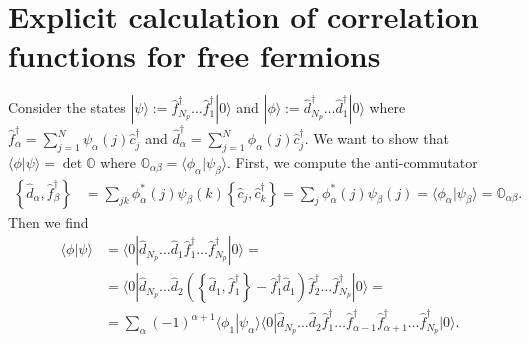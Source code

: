 \documentclass[english, parskip=full]{scrartcl}
\title{\titel}
\author{\autor}
\date{\today}
\newcommand{\brak}{}
\renewcommand{\braket}{}
\newcommand{\kla}{}
\newcommand{\klammer}{}
\newcommand{\Ket}{}
\begin{document}
\maketitle  %

\section{Explicit calculation of correlation functions for free fermions}
Consider the states $\Ket | \psi \rangle := \hat{f}_{N_p}^\dagger \dots \hat{f}_{1}^\dagger \Ket | 0 \rangle$ and $\Ket | \phi \rangle := \hat{d}_{N_p}^\dagger \dots \hat{d}_{1}^\dagger \Ket | 0 \rangle$ where $\hat{f}_{\alpha}^\dagger = \sum_{j=1}^N \psi_\alpha(j) \hat{c}_j^\dagger$ and $\hat{d}_{\alpha}^\dagger = \sum_{j=1}^N \phi_\alpha(j) \hat{c}_j^\dagger$.
We want to show that $\brak\langle \phi | \psi \rangle = \det \mathbb{O}$ where $\mathbb{O}_{\alpha\beta} = \brak\langle \phi_\alpha | \psi_\beta \rangle$.
First, we compute the anti-commutator 
\begin{align}
\klammer\left\{ \hat{d}_\alpha, \hat{f}_\beta^\dagger \right\} &= \sum_{jk} \phi_\alpha^\ast(j)\psi_\beta(k) \klammer\left\{ \hat{c}_j, \hat{c}_k^\dagger \right\} = \sum_j \phi_\alpha^\ast(j) \psi_\beta(j) = \brak\langle \phi_\alpha | \psi_\beta \rangle = \mathbb{O}_{\alpha\beta}. 
\end{align}
Then we find
\begin{align}
\brak\langle \phi | \psi \rangle &= \braket\langle 0 | \hat{d}_{N_p}\dots \hat{d}_1 \hat{f}_1^\dagger \dots \hat{f}_{N_p}^\dagger | 0 \rangle = \\
&= \langle 0 | \hat{d}_{N_p}\dots \hat{d}_2 \kla\left( \klammer\left\{ \hat{d}_1, \hat{f}_1^\dagger \right\} - \hat{f}_1^\dagger \hat{d}_1 \right) \hat{f}_2^\dagger \dots \hat{f}_{N_p}^\dagger | 0 \rangle = \\
&= \sum_{\alpha} (-1)^{\alpha+1} \brak\langle \phi_1 | \psi_\alpha \rangle \braket\langle 0 | \hat{d}_{N_p} \dots \hat{d}_2 \hat{f}_1^\dagger \dots \hat{f}_{\alpha-1}^\dagger \hat{f}_{\alpha+1}^\dagger \dots \hat{f}_{N_p}^\dagger | 0 \rangle. \label{eqn:phi psi determinant step 1}
\end{align}
\end{document}
